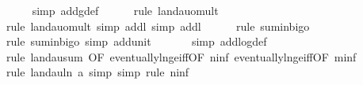 \begin{isabellebody}
\ \ \ \ \isamarkupfalse%
\ {\isacharparenleft}{\kern0pt}simp\ add{\isacharcolon}{\kern0pt}g{\isacharunderscore}{\kern0pt}def{\isacharparenright}{\kern0pt}\isanewline
\ \ \ \ \isamarkupfalse%
\ {\isacharparenleft}{\kern0pt}rule\ landau{\isacharunderscore}{\kern0pt}o{\isachardot}{\kern0pt}mult{\isacharparenright}{\kern0pt}\isanewline
\ \ \ \ \ \isamarkupfalse%
\ {\isacharparenleft}{\kern0pt}rule\ landau{\isacharunderscore}{\kern0pt}o{\isachardot}{\kern0pt}mult{\isacharcomma}{\kern0pt}\ simp\ add{\isacharcolon}{\kern0pt}l{}{\isacharcomma}{\kern0pt}\ simp\ add{\isacharcolon}{\kern0pt}l{}{\isacharparenright}{\kern0pt}\isanewline
\ \ \ \ \isamarkupfalse%
\ {\isacharparenleft}{\kern0pt}rule\ sum{\isacharunderscore}{\kern0pt}in{\isacharunderscore}{\kern0pt}bigo{\isacharparenright}{\kern0pt}\isanewline
\ \ \ \ \ \isamarkupfalse%
\ {\isacharparenleft}{\kern0pt}rule\ sum{\isacharunderscore}{\kern0pt}in{\isacharunderscore}{\kern0pt}bigo{\isacharcomma}{\kern0pt}\ simp\ add{\isacharcolon}{\kern0pt}unit{\isacharunderscore}{\kern0pt}{}{\isacharparenright}{\kern0pt}\isanewline
\ \ \ \ \ \isamarkupfalse%
\ {\isacharparenleft}{\kern0pt}simp\ add{\isacharcolon}{\kern0pt}log{\isacharunderscore}{\kern0pt}def{\isacharparenright}{\kern0pt}\isanewline
\ \ \ \ \ \isamarkupfalse%
\ {\isacharparenleft}{\kern0pt}rule\ landau{\isacharunderscore}{\kern0pt}sum{\isacharunderscore}{\kern0pt}{}\ {\isacharbrackleft}{\kern0pt}OF\ eventually{\isacharunderscore}{\kern0pt}ln{\isacharunderscore}{\kern0pt}ge{\isacharunderscore}{\kern0pt}iff{\isacharbrackleft}{\kern0pt}OF\ n{\isacharunderscore}{\kern0pt}inf{\isacharbrackright}{\kern0pt}\ eventually{\isacharunderscore}{\kern0pt}ln{\isacharunderscore}{\kern0pt}ge{\isacharunderscore}{\kern0pt}iff{\isacharbrackleft}{\kern0pt}OF\ m{\isacharunderscore}{\kern0pt}inf{\isacharbrackright}{\kern0pt}{\isacharbrackright}{\kern0pt}{\isacharparenright}{\kern0pt}\isanewline
\ \ \ \ \ \isamarkupfalse%
\ {\isacharparenleft}{\kern0pt}rule\ landau{\isacharunderscore}{\kern0pt}ln{\isacharunderscore}{\kern0pt}{}{\isacharbrackleft}{\kern0pt}\ a{\isacharequal}{\kern0pt}{\isachardoublequoteopen}{}{\isachardoublequoteclose}{\isacharbrackright}{\kern0pt}{\isacharcomma}{\kern0pt}\ simp{\isacharcomma}{\kern0pt}\ simp{\isacharcomma}{\kern0pt}\ rule\ n{\isacharunderscore}{\kern0pt}inf{\isacharparenright}{\kern0pt}\isanewline
\ \ \ \ \isamarkupfalse%

\end{isabellebody}
